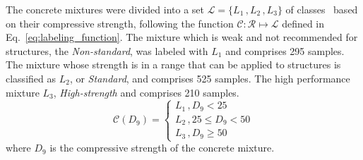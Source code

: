 \documentclass[conference]{IEEEtran}
\begin{document}
The concrete mixtures were divided into a set $\mathcal{L} = \{L_1\,, L_2\,, L_3\}$ of classes~\cite{b1} based on their compressive strength, following the function $\mathcal{C} \colon \mathcal{R} \mapsto \mathcal{L}$ defined in Eq.~\ref{eq:labeling_function}. The mixture which is weak and not recommended for structures, the \emph{Non-standard}, was labeled with $L_1$ and comprises 295 samples. The mixture whose strength is in a range that can be applied to structures is classified as $L_2$, or \emph{Standard}, and comprises 525 samples. The high performance mixture $L_3$, \emph{High-strength} and comprises 210 samples.
%
\begin{equation}\label{eq:labeling_function}
  \mathcal{C}(D_9) = \begin{cases}
    L_1\,, D_9 < 25\\
    L_2\,, 25 \leq D_9 < 50\\
    L_3\,, D_9 \geq 50
  \end{cases}
\end{equation}
%
where $D_9$ is the compressive strength of the concrete mixture.
\end{document}
